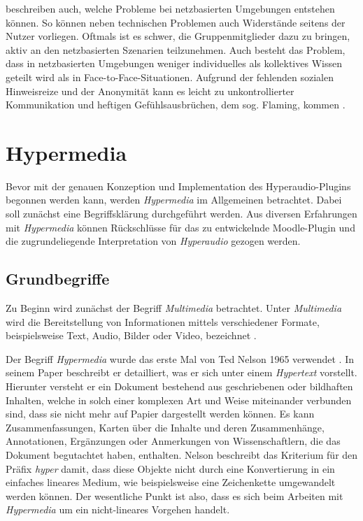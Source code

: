 \cite{reinmann2002analyse} beschreiben auch, welche Probleme bei netzbasierten Umgebungen entstehen können. So können neben technischen Problemen auch Widerstände seitens der Nutzer vorliegen. Oftmals ist es schwer, die Gruppenmitglieder dazu zu bringen, aktiv an den netzbasierten Szenarien teilzunehmen. Auch besteht das Problem, dass in netzbasierten Umgebungen weniger individuelles als kollektives Wissen geteilt wird als in Face-to-Face-Situationen. Aufgrund der fehlenden sozialen Hinweisreize und der Anonymität kann \glqq es leicht zu unkontrollierter Kommunikation und heftigen Gefühlsausbrüchen, dem sog. Flaming, kommen\grqq{} \citep{reinmann2002analyse}.


\section{Hypermedia}
Bevor mit der genauen Konzeption und Implementation des Hyperaudio-Plugins begonnen werden kann, werden \textit{Hypermedia} im Allgemeinen betrachtet. Dabei soll zunächst eine Begriffsklärung durchgeführt werden. Aus diversen Erfahrungen mit \textit{Hypermedia} können Rückschlüsse für das zu entwickelnde Moodle-Plugin und die zugrundeliegende Interpretation von \textit{Hyperaudio} gezogen werden.


\subsection{Grundbegriffe}
Zu Beginn wird zunächst der Begriff \textit{Multimedia} betrachtet. Unter \textit{Multimedia} wird die Bereitstellung von Informationen mittels verschiedener Formate, beispielsweise Text, Audio, Bilder oder Video, bezeichnet \citep{mayer2009multimedia,moos2010multimedia}.

Der Begriff \textit{Hypermedia} wurde das erste Mal von Ted Nelson 1965 verwendet \citep{nelson1965complex}. In seinem Paper beschreibt er detailliert, was er sich unter einem \textit{Hypertext} vorstellt. Hierunter versteht er ein Dokument bestehend aus geschriebenen oder bildhaften Inhalten, welche in solch einer komplexen Art und Weise miteinander verbunden sind, dass sie nicht mehr auf Papier dargestellt werden können. Es kann Zusammenfassungen, Karten über die Inhalte und deren Zusammenhänge, Annotationen, Ergänzungen oder Anmerkungen von Wissenschaftlern, die das Dokument begutachtet haben, enthalten. Nelson beschreibt das Kriterium für den Präfix \textit{hyper} damit, dass diese Objekte nicht durch eine Konvertierung in ein einfaches lineares Medium, wie beispielsweise eine Zeichenkette umgewandelt werden können. Der wesentliche Punkt ist also, dass es sich beim Arbeiten mit \textit{Hypermedia} um ein nicht-lineares Vorgehen handelt.

